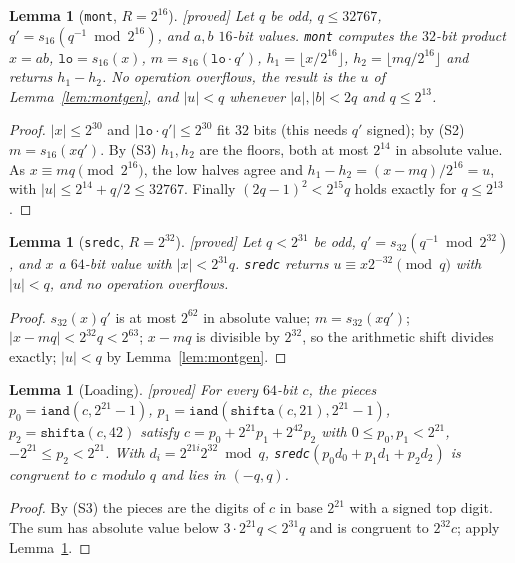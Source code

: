 \documentclass[10pt,a4paper]{article}
\newcommand{\code}[1]{\texttt{#1}}
\newcommand{\stproved}{\textsf{\small[proved]}\xspace}
\theoremstyle{plain}
\newtheorem{lemma}[proposition]{Lemma}
\theoremstyle{definition}
\begin{document}
\begin{lemma}[\code{mont}, $R=2^{16}$]\label{lem:mont}\stproved
Let $q$ be odd, $q\le32767$, $q'=s_{16}(q^{-1}\bmod2^{16})$, and $a,b$ $16$-bit values.  \code{mont} computes the $32$-bit product $x=ab$, $\code{lo}=s_{16}(x)$,
$m=s_{16}(\code{lo}\cdot q')$, $h_1=\lfloor x/2^{16}\rfloor$, $h_2=\lfloor mq/2^{16}\rfloor$ and returns $h_1-h_2$.  No operation overflows, the result is the $u$ of
Lemma~\ref{lem:montgen}, and $|u|<q$ whenever $|a|,|b|<2q$ and $q\le2^{13}$.
\end{lemma}
\begin{proof}
$|x|\le2^{30}$ and $|\code{lo}\cdot q'|\le2^{30}$ fit $32$ bits (this needs $q'$ signed); by (S2) $m=s_{16}(xq')$.  By (S3) $h_1,h_2$ are the floors, both at most $2^{14}$ in
absolute value.  As $x\equiv mq\pmod{2^{16}}$, the low halves agree and $h_1-h_2=(x-mq)/2^{16}=u$, with $|u|\le2^{14}+q/2\le32767$.  Finally $(2q-1)^2<2^{15}q$
holds exactly for $q\le2^{13}$.
\end{proof}

\begin{lemma}[\code{sredc}, $R=2^{32}$]\label{lem:sredc}\stproved
Let $q<2^{31}$ be odd, $q'=s_{32}(q^{-1}\bmod2^{32})$, and $x$ a $64$-bit value with $|x|<2^{31}q$.  \code{sredc} returns $u\equiv x2^{-32}\pmod q$ with $|u|<q$, and no
operation overflows.
\end{lemma}
\begin{proof}
$s_{32}(x)q'$ is at most $2^{62}$ in absolute value; $m=s_{32}(xq')$; $|x-mq|<2^{32}q<2^{63}$; $x-mq$ is divisible by $2^{32}$, so the arithmetic shift divides exactly;
$|u|<q$ by Lemma~\ref{lem:montgen}.
\end{proof}

\begin{lemma}[Loading]\label{lem:ldres}\stproved
For every $64$-bit $c$, the pieces $p_0=\code{iand}(c,2^{21}-1)$, $p_1=\code{iand}(\code{shifta}(c,21),2^{21}-1)$, $p_2=\code{shifta}(c,42)$ satisfy
$c=p_0+2^{21}p_1+2^{42}p_2$ with $0\le p_0,p_1<2^{21}$, $-2^{21}\le p_2<2^{21}$.  With $d_i=2^{21i}2^{32}\bmod q$, \code{sredc}$(p_0d_0+p_1d_1+p_2d_2)$ is congruent to $c$
modulo $q$ and lies in $(-q,q)$.
\end{lemma}
\begin{proof}
By (S3) the pieces are the digits of $c$ in base $2^{21}$ with a signed top digit.  The sum has absolute value below $3\cdot2^{21}q<2^{31}q$ and is congruent to $2^{32}c$;
apply Lemma~\ref{lem:sredc}.
\end{proof}
\end{document}
